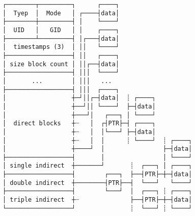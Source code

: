 \documentclass[varwidth,crop]{standalone}
\begin{document}
\begin{verbatim}
┌────────┬─────────┐      ┌────┐
│  Tyep  │  Mode   │ ┌────┤data│
├────────┼─────────┤ │    └────┘
│  UID   │   GID   │ │    ┌────┐
├────────┴─────────┤ │┌───┤data│
│  timestamps (3)  │ ││   └────┘
├──────────────────┤ ││   ┌────┐
│ size block count │ ││┌──┤data│
├──────────────────┤ │││  └────┘
│       ...        │ │││   ...
├──────────────────┤ │││  ┌────┐
│                  ┼─┘││┌─┤data│  ┊ ┌────┐
│                  ┼──┘││ └────┘  ├─┤data│
│                  ┼───┘│   ┌───┐ │ └────┘
│  direct blocks   ┼┈   │  ┌┤PTR├─┤ ┌────┐
│                  ┼┈   │  │└───┘ ├─┤data│
│                  ┼┈   │  │      ┊ └────┘  ┊ ┌────┐
│                  ┼────┘  │                ├─┤data│
├──────────────────┤       │                │ └────┘
│ single indirect  ┼───────┘       ┊  ┌───┐ │ ┌────┐
├──────────────────┤        ┌───┐  ├──┤PTR├─┼─┤data│
│ double indirect  ┼────────┤PTR├──┤  └───┘   └────┘
├──────────────────┤        └───┘  │  ┌───┐ ┊ ┌────┐
│ triple indirect  ┼┈              ├──┤PTR├─┼─┤data│
└──────────────────┘               ┊  └───┘ ┊ └────┘
\end{verbatim}
\end{document}
